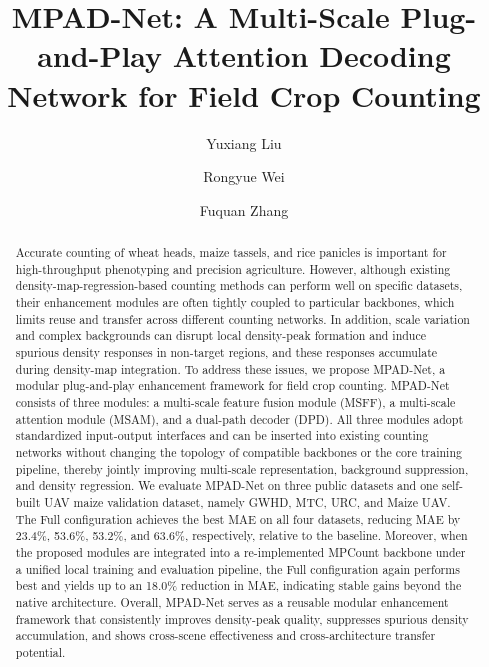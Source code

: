 \documentclass[a4paper,fleqn]{cas-sc}
\begin{document}
	\let\WriteBookmarks\relax
	\def\floatpagepagefraction{1}
	\def\textpagefraction{.001}
	
	
	\title[mode = title]{MPAD-Net: A Multi-Scale Plug-and-Play Attention Decoding Network for Field Crop Counting}
	
	\author{Yuxiang Liu}
	\author{Rongyue Wei}
	\author{Fuquan Zhang}
	
	\begin{abstract}
		Accurate counting of wheat heads, maize tassels, and rice panicles is important for high-throughput phenotyping and precision agriculture. However, although existing density-map-regression-based counting methods can perform well on specific datasets, their enhancement modules are often tightly coupled to particular backbones, which limits reuse and transfer across different counting networks. In addition, scale variation and complex backgrounds can disrupt local density-peak formation and induce spurious density responses in non-target regions, and these responses accumulate during density-map integration. To address these issues, we propose MPAD-Net, a modular plug-and-play enhancement framework for field crop counting. MPAD-Net consists of three modules: a multi-scale feature fusion module (MSFF), a multi-scale attention module (MSAM), and a dual-path decoder (DPD). All three modules adopt standardized input-output interfaces and can be inserted into existing counting networks without changing the topology of compatible backbones or the core training pipeline, thereby jointly improving multi-scale representation, background suppression, and density regression. We evaluate MPAD-Net on three public datasets and one self-built UAV maize validation dataset, namely GWHD, MTC, URC, and Maize UAV. The Full configuration achieves the best MAE on all four datasets, reducing MAE by 23.4\%, 53.6\%, 53.2\%, and 63.6\%, respectively, relative to the baseline. Moreover, when the proposed modules are integrated into a re-implemented MPCount backbone under a unified local training and evaluation pipeline, the Full configuration again performs best and yields up to an 18.0\% reduction in MAE, indicating stable gains beyond the native architecture. Overall, MPAD-Net serves as a reusable modular enhancement framework that consistently improves density-peak quality, suppresses spurious density accumulation, and shows cross-scene effectiveness and cross-architecture transfer potential.
	\end{abstract}
	
\end{document}

